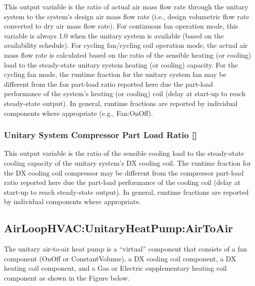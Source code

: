 This output variable is the ratio of actual air mass flow rate through the unitary system to the system's design air mass flow rate (i.e., design volumetric flow rate converted to dry air mass flow rate). For continuous fan operation mode, this variable is always 1.0 when the unitary system is available (based on the availability schedule). For cycling fan/cycling coil operation mode, the actual air mass flow rate is calculated based on the ratio of the sensible heating (or cooling) load to the steady-state unitary system heating (or cooling) capacity. For the cycling fan mode, the runtime fraction for the unitary system fan may be different from the fan part-load ratio reported here due the part-load performance of the system's heating (or cooling) coil (delay at start-up to reach steady-state output). In general, runtime fractions are reported by individual components where appropriate (e.g., Fan:OnOff).

\subsubsection{\texorpdfstring{Unitary System Compressor Part Load Ratio {[]}}{Unitary System Compressor Part Load Ratio }}\label{unitary-system-compressor-part-load-ratio-1}

This output variable is the ratio of the sensible cooling load to the steady-state cooling capacity of the unitary system's DX cooling coil. The runtime fraction for the DX cooling coil compressor may be different from the compressor part-load ratio reported here due the part-load performance of the cooling coil (delay at start-up to reach steady-state output). In general, runtime fractions are reported by individual components where appropriate.

\subsection{AirLoopHVAC:UnitaryHeatPump:AirToAir}\label{airloophvacunitaryheatpumpairtoair}

The unitary air-to-air heat pump is a ``virtual'' component that consists of a fan component (OnOff or ConstantVolume), a DX cooling coil component, a DX heating coil component, and a Gas or Electric supplementary heating coil component as shown in the Figure below.

